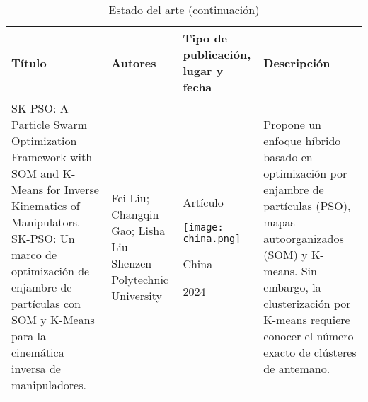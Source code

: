 \newpage
\begin{table}[htb]
	\caption{Estado del arte (continuación)}
	\centering
	\begin{tabular}{p{5cm}p{4cm}p{3.6cm}p{4cm}}
		\textbf{Título} & \textbf{Autores} & \textbf{Tipo de publicación, lugar y fecha} & \textbf{Descripción} \\ 
		\midrule
		SK-PSO: A Particle Swarm Optimization Framework with SOM and K-Means for Inverse Kinematics of Manipulators. \newline\newline
		SK-PSO: Un marco de optimización de enjambre de partículas con SOM y K-Means para la cinemática inversa de manipuladores. &  
		Fei Liu; Changqin Gao; Lisha Liu \newline\newline 
		Shenzen Polytechnic University & 
		\begin{center}Artículo \par \texttt{[image: china.png]} \par China \par 2024\end{center} & 
		Propone un enfoque híbrido basado en optimización por enjambre de partículas (PSO), mapas autoorganizados (SOM) y K-means. \newline\newline Sin embargo, la clusterización por K-means requiere conocer el número exacto de clústeres de antemano. \\
	\end{tabular}
\end{table}